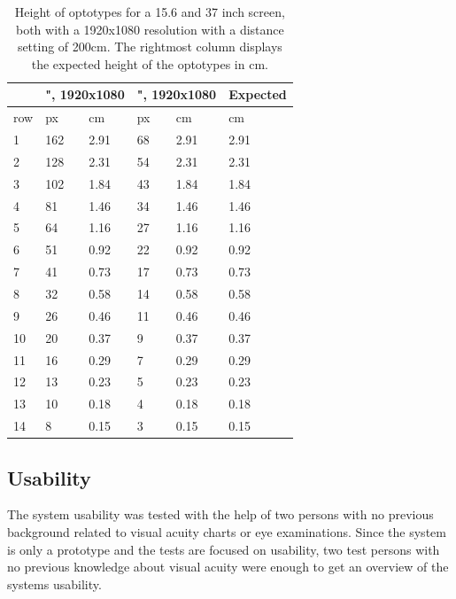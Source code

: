 \documentclass[12pt,a4paper,notitlepage]{report}
\begin{document}
\begin{table}[ht!]
\centering
\begin{tabular}{ p{1cm}|p{1cm}p{1cm}|p{1cm}p{1cm}|p{1cm} }
	 &	\multicolumn{2}{c}{\parbox{2cm}{", 1920x1080}} & \multicolumn{2}{c}{\parbox{2cm}{", 1920x1080}}	& 	Expected	\\
\hline
	 row  & px & cm & px & cm & cm \\
\hline\hline				
								1	&	162	&	2.91	&	68	&	2.91	&	2.91\\	
								2	&	128 & 	2.31	& 	54	&	2.31	&	2.31\\
		 						3	&	102 & 	1.84	& 	43	&	1.84	&	1.84\\
								4	&	81 	& 	1.46	& 	34	&	1.46	&	1.46\\
								5	&	64 	& 	1.16	& 	27	&	1.16	&	1.16\\
								6	&	51 	& 	0.92	& 	22	&	0.92	&	0.92\\
								7	&	41 	& 	0.73	& 	17	&	0.73	&	0.73\\
								8	&	32 	& 	0.58	& 	14	&	0.58	&	0.58\\
								9	&	26 	& 	0.46	& 	11	&	0.46	&	0.46\\
								10	&	20 	& 	0.37	& 	9	&	0.37	&	0.37\\
								11	&	16 	& 	0.29	& 	7	&	0.29	&	0.29\\
								12	&	13 	& 	0.23	& 	5	&	0.23	&	0.23\\
								13	&	10 	& 	0.18	& 	4	&	0.18	&	0.18\\
								14	&	8 	& 	0.15	& 	3	&	0.15	&	0.15\\
										\hline
\end{tabular}
\caption{Height of optotypes for a 15.6 and 37 inch screen, both with a 1920x1080 resolution with a distance setting of 200cm. The rightmost column displays the expected height of the optotypes in cm.} \label{tab:optotype_test}
\end{table}


\subsection{Usability}
The system usability was tested with the help of two persons with no previous background related to visual acuity charts or eye examinations. Since the system is only a prototype and the tests are focused on usability, two test persons with no previous knowledge about visual acuity were enough to get an overview of the systems usability.
\end{document}
